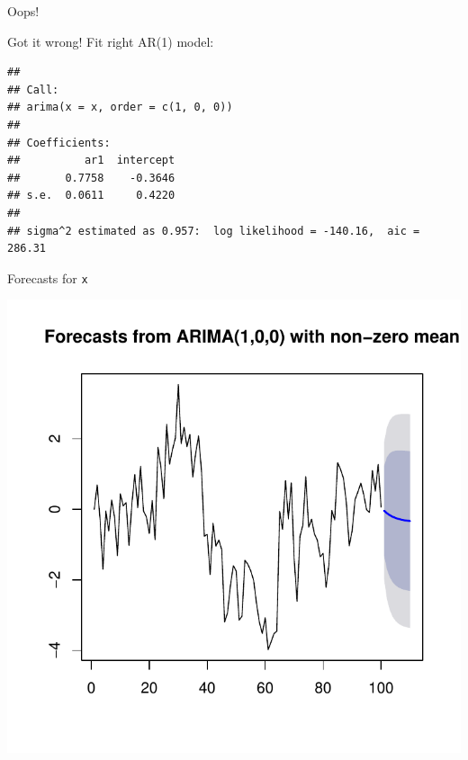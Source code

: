 \begin{frame}[fragile]{Oops!}
  
Got it wrong! Fit right AR(1) model:

\begin{knitrout}
\color{fgcolor}\begin{kframe}
\begin{alltt}
\hlkwb{=}\hlstd{=}\hlstd{(}\hlstd{,}\hlstd{,}\hlstd{))}
\end{alltt}
\begin{verbatim}
## 
## Call:
## arima(x = x, order = c(1, 0, 0))
## 
## Coefficients:
##          ar1  intercept
##       0.7758    -0.3646
## s.e.  0.0611     0.4220
## 
## sigma^2 estimated as 0.957:  log likelihood = -140.16,  aic = 286.31
\end{verbatim}
\end{kframe}
\end{knitrout}

  
  
\end{frame}

\begin{frame}[fragile]{Forecasts for \texttt{x}}
  
\begin{knitrout}
\color{fgcolor}\begin{kframe}
\begin{alltt}
\hlstd{(}
\end{alltt}
\end{kframe}
\includegraphics[width=\maxwidth]{figure/reggiana-1} 

\end{knitrout}
  
\end{frame}


